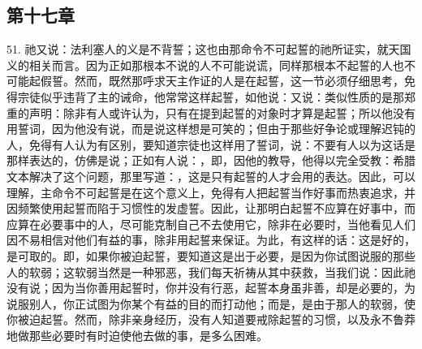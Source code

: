 
\subsection{第十七章}

51. 祂又说：\newline{}法利塞人的义是不背誓；这也由那命令不可起誓的祂所证实，就天国义的相关而言。因为正如那根本不说的人不可能说谎，同样那根本不起誓的人也不可能起假誓。然而，既然那呼求天主作证的人是在起誓，这一节必须仔细思考，免得宗徒似乎违背了主的诫命，他常常这样起誓，如他说：又说：类似性质的是那郑重的声明：除非有人或许认为，只有在提到起誓的对象时才算是起誓；所以他没有用誓词，因为他没有说，而是说这样想是可笑的；但由于那些好争论或理解迟钝的人，免得有人认为有区别，要知道宗徒也这样用了誓词，说：不要有人以为这话是那样表达的，仿佛是说；正如有人说：，即，因他的教导，他得以完全受教：希腊文本解决了这个问题，那里写道：，这是只有起誓的人才会用的表达。因此，可以理解，主命令不可起誓是在这个意义上，免得有人把起誓当作好事而热衷追求，并因频繁使用起誓而陷于习惯性的发虚誓。因此，让那明白起誓不应算在好事中，而应算在必要事中的人，尽可能克制自己不去使用它，除非在必要时，当他看见人们因不易相信对他们有益的事，除非用起誓来保证。为此，有这样的话：这是好的，是可取的。即，如果你被迫起誓，要知道这是出于必要，是因为你试图说服的那些人的软弱；这软弱当然是一种邪恶，我们每天祈祷从其中获救，当我们说：因此祂没有说；因为当你善用起誓时，你并没有行恶，起誓本身虽非善，却是必要的，为说服别人，你正试图为你某个有益的目的而打动他；而是，是由于那人的软弱，使你被迫起誓。然而，除非亲身经历，没有人知道要戒除起誓的习惯，以及永不鲁莽地做那些必要时有时迫使他去做的事，是多么困难。\par

